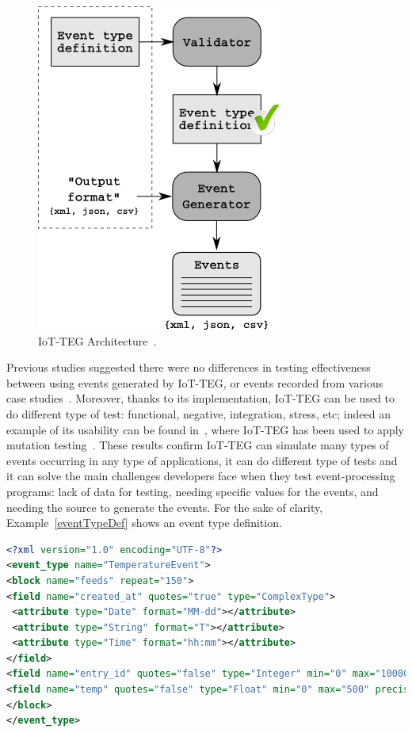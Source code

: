 \documentclass[10pt,journal,compsoc]{IEEEtran}
\begin{document}
\begin{figure}[!ht]
	\centering
	\includegraphics[scale=0.4]{Images/IoT-EGArquitecture}
	\caption[IoT-TEG Architecture]{IoT-TEG Architecture~\cite{TesisGutierrez2017,Gutierrez2017}.}
	\label{fig:IoT-EGArquitecture}
\end{figure}
Previous studies suggested there were no differences in testing effectiveness between using events
generated by IoT-TEG, or events recorded from various case studies~\cite{Gutierrez2017,TesisGutierrez2017}.
Moreover, thanks to its implementation, IoT-TEG can be used to do different type of test: functional,
negative, integration, stress, etc; indeed an example of its usability can be found 
in~\cite{TesisGutierrez2017,gutierrez2018}, where IoT-TEG has been used to apply mutation 
testing~\cite{jia2011}. These results confirm IoT-TEG can 
simulate many types of events occurring in any type of applications, it can do different type of tests
and it can solve the main challenges developers face when they test event-processing programs: lack of data for testing, needing specific values for the events, and needing the source to generate the events.
For the sake of clarity, Example~\ref{eventTypeDef} shows an event type
definition.
\begin{lstlisting}[basicstyle=\ttfamily\footnotesize,language=XML,caption=Event type definition example,label=eventTypeDef, breaklines=true]
<?xml version="1.0" encoding="UTF-8"?>
<event_type name="TemperatureEvent">
<block name="feeds" repeat="150">
<field name="created_at" quotes="true" type="ComplexType">
 <attribute type="Date" format="MM-dd"></attribute>
 <attribute type="String" format="T"></attribute>
 <attribute type="Time" format="hh:mm"></attribute>
</field>
<field name="entry_id" quotes="false" type="Integer" min="0" max="10000"></field>
<field name="temp" quotes="false" type="Float" min="0" max="500" precision="1"></field>
</block>
</event_type>
\end{lstlisting}
\end{document}
